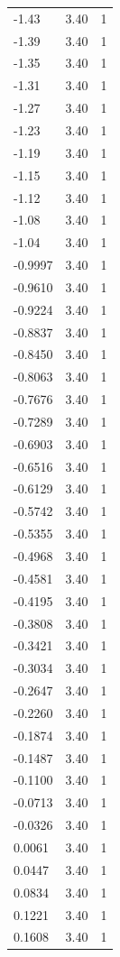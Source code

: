 \begin{longtable}{lrr}
  -1.43 & 3.40 & 1 \\
  -1.39 & 3.40 & 1 \\
  -1.35 & 3.40 & 1 \\
  -1.31 & 3.40 & 1 \\
  -1.27 & 3.40 & 1 \\
  -1.23 & 3.40 & 1 \\
  -1.19 & 3.40 & 1 \\
  -1.15 & 3.40 & 1 \\
  -1.12 & 3.40 & 1 \\
  -1.08 & 3.40 & 1 \\
  -1.04 & 3.40 & 1 \\
  -0.9997 & 3.40 & 1 \\
  -0.9610 & 3.40 & 1 \\
  -0.9224 & 3.40 & 1 \\
  -0.8837 & 3.40 & 1 \\
  -0.8450 & 3.40 & 1 \\
  -0.8063 & 3.40 & 1 \\
  -0.7676 & 3.40 & 1 \\
  -0.7289 & 3.40 & 1 \\
  -0.6903 & 3.40 & 1 \\
  -0.6516 & 3.40 & 1 \\
  -0.6129 & 3.40 & 1 \\
  -0.5742 & 3.40 & 1 \\
  -0.5355 & 3.40 & 1 \\
  -0.4968 & 3.40 & 1 \\
  -0.4581 & 3.40 & 1 \\
  -0.4195 & 3.40 & 1 \\
  -0.3808 & 3.40 & 1 \\
  -0.3421 & 3.40 & 1 \\
  -0.3034 & 3.40 & 1 \\
  -0.2647 & 3.40 & 1 \\
  -0.2260 & 3.40 & 1 \\
  -0.1874 & 3.40 & 1 \\
  -0.1487 & 3.40 & 1 \\
  -0.1100 & 3.40 & 1 \\
  -0.0713 & 3.40 & 1 \\
  -0.0326 & 3.40 & 1 \\
  0.0061 & 3.40 & 1 \\
  0.0447 & 3.40 & 1 \\
  0.0834 & 3.40 & 1 \\
  0.1221 & 3.40 & 1 \\
  0.1608 & 3.40 & 1 \\

\end{longtable}
